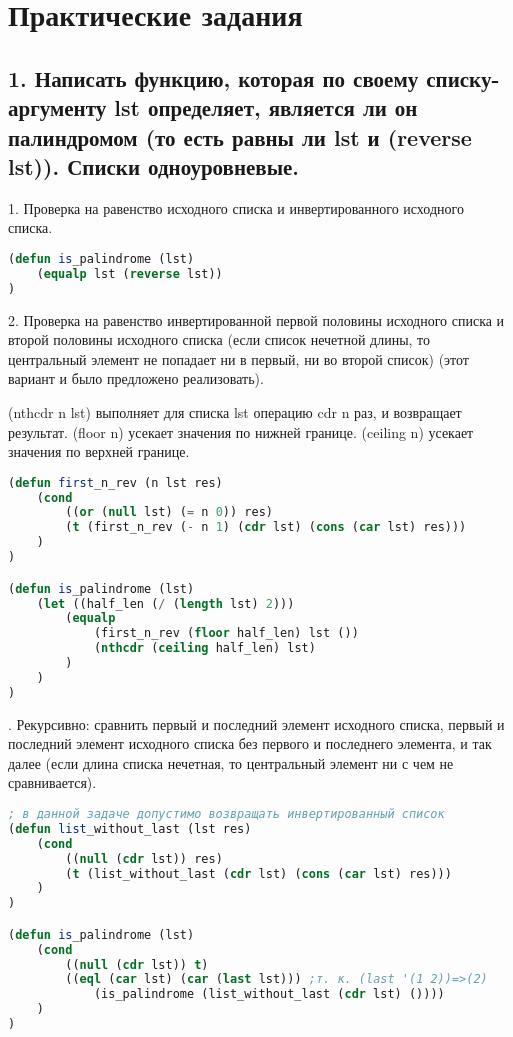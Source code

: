 \documentclass[12pt]{report}
\begin{document}
	\thispagestyle{empty}


	




\chapter*{Практические задания}	

\section*{1. Написать функцию, которая по своему списку-аргументу lst определяет, является ли он палиндромом (то есть равны ли lst и (reverse lst)). Списки одноуровневые.}

1. Проверка на равенство исходного списка и инвертированного исходного списка.
\begin{lstlisting}[language=Lisp]
(defun is_palindrome (lst) 
	(equalp lst (reverse lst))
)
\end{lstlisting}

2. Проверка на равенство инвертированной первой половины исходного списка и второй половины исходного списка (если список нечетной длины, то центральный элемент не попадает ни в первый, ни во второй список) (этот вариант и было предложено реализовать).

(nthcdr n lst) выполняет для списка lst операцию cdr n раз, и возвращает результат. (floor n) усекает значения по нижней границе. (ceiling n) усекает значения по верхней границе.
\begin{lstlisting}[language=Lisp]
(defun first_n_rev (n lst res) 
	(cond 
		((or (null lst) (= n 0)) res)
		(t (first_n_rev (- n 1) (cdr lst) (cons (car lst) res)))
	)
)

(defun is_palindrome (lst)
	(let ((half_len (/ (length lst) 2)))
		(equalp 
			(first_n_rev (floor half_len) lst ()) 
			(nthcdr (ceiling half_len) lst)
		)
	)
)
\end{lstlisting}

. Рекурсивно: сравнить первый и последний элемент исходного списка, первый и последний элемент исходного списка без первого и последнего элемента, и так далее (если длина списка нечетная, то центральный элемент ни с чем не сравнивается).

\begin{lstlisting}[language=Lisp]
; в данной задаче допустимо возвращать инвертированный список
(defun list_without_last (lst res)
	(cond
		((null (cdr lst)) res)
		(t (list_without_last (cdr lst) (cons (car lst) res)))
	)
)

(defun is_palindrome (lst)
	(cond 
		((null (cdr lst)) t)
		((eql (car lst) (car (last lst))) ;т. к. (last '(1 2))=>(2)
			(is_palindrome (list_without_last (cdr lst) ())))
	)
)
\end{lstlisting}
\end{document}

